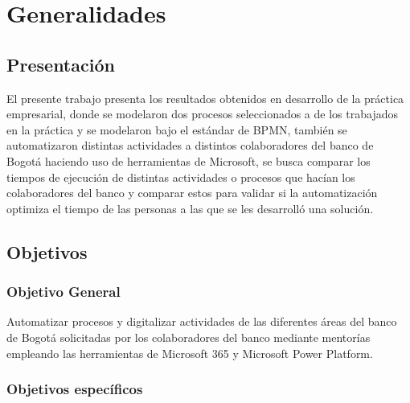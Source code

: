
\chapter{Generalidades}

\section{Presentación} %
El presente trabajo presenta los resultados obtenidos en desarrollo de la práctica empresarial, donde se modelaron dos procesos seleccionados a de los trabajados en la práctica y se modelaron bajo el estándar de BPMN, también se automatizaron distintas actividades a distintos colaboradores del banco de Bogotá haciendo uso de herramientas de Microsoft, se busca comparar los tiempos de ejecución de distintas actividades o procesos que hacían los colaboradores del banco y comparar estos para validar si la automatización optimiza el tiempo de las personas a las que se les desarrolló una solución.

\section{Objetivos}
\subsection{Objetivo General}
Automatizar procesos y digitalizar actividades de las diferentes áreas del banco de Bogotá
solicitadas por los colaboradores del banco mediante mentorías empleando las herramientas
de Microsoft 365 y Microsoft Power Platform.

\subsection{Objetivos específicos}

